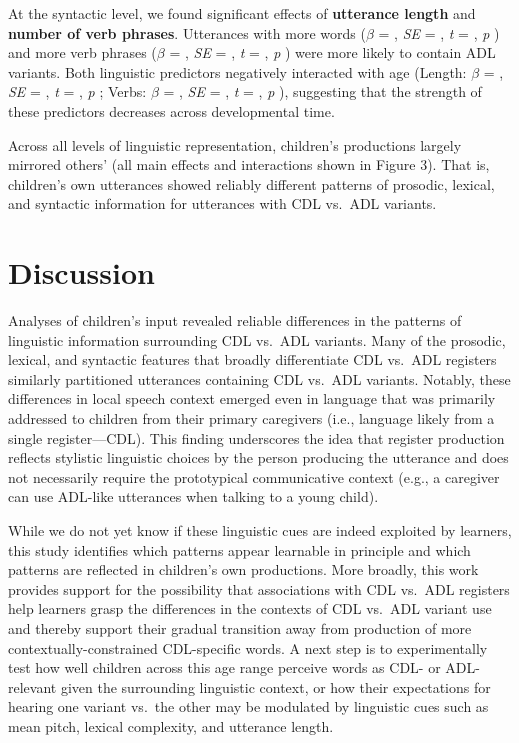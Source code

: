 \documentclass[10pt, letterpaper]{article}
\begin{document}
At the syntactic level, we found significant effects of
\textbf{utterance length} and \textbf{number of verb phrases}.
Utterances with more words (\(\beta\) = , \emph{SE} = , \emph{t} = ,
\emph{p} ) and more verb phrases (\(\beta\) = , \emph{SE} = , \emph{t} =
, \emph{p} ) were more likely to contain ADL variants. Both linguistic
predictors negatively interacted with age (Length: \(\beta\) = ,
\emph{SE} = , \emph{t} = , \emph{p} ; Verbs: \(\beta\) = , \emph{SE} = ,
\emph{t} = , \emph{p} ), suggesting that the strength of these
predictors decreases across developmental time.

Across all levels of linguistic representation, children's productions
largely mirrored others' (all main effects and interactions shown in
Figure 3). That is, children's own utterances showed reliably different
patterns of prosodic, lexical, and syntactic information for utterances
with CDL vs.~ADL variants.

\hypertarget{discussion-1}{%
\section{Discussion}\label{discussion-1}}

Analyses of children's input revealed reliable differences in the
patterns of linguistic information surrounding CDL vs.~ADL variants.
Many of the prosodic, lexical, and syntactic features that broadly
differentiate CDL vs.~ADL registers similarly partitioned utterances
containing CDL vs.~ADL variants. Notably, these differences in local
speech context emerged even in language that was primarily addressed to
children from their primary caregivers (i.e., language likely from a
single register---CDL). This finding underscores the idea that register
production reflects stylistic linguistic choices by the person producing
the utterance and does not necessarily require the prototypical
communicative context (e.g., a caregiver can use ADL-like utterances
when talking to a young child).

While we do not yet know if these linguistic cues are indeed exploited
by learners, this study identifies which patterns appear learnable in
principle and which patterns are reflected in children's own
productions. More broadly, this work provides support for the
possibility that associations with CDL vs.~ADL registers help learners
grasp the differences in the contexts of CDL vs.~ADL variant use and
thereby support their gradual transition away from production of more
contextually-constrained CDL-specific words. A next step is to
experimentally test how well children across this age range perceive
words as CDL- or ADL-relevant given the surrounding linguistic context,
or how their expectations for hearing one variant vs.~the other may be
modulated by linguistic cues such as mean pitch, lexical complexity, and
utterance length.
\end{document}
